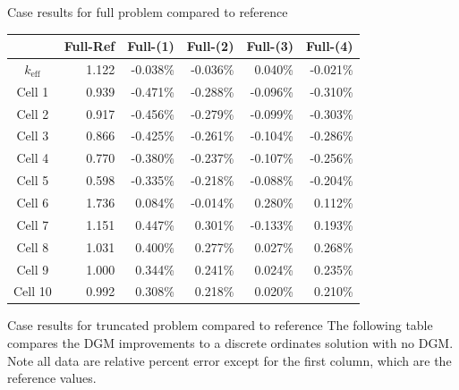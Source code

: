 \documentclass[final]{beamer}
\begin{document}
\begin{frame}{}
\begin{columns}[t]
\begin{column}{.32\linewidth}
\begin{block}{Case results for full problem compared to reference}
                \begin{tabular}{c|r|r|r|r|r}
                & Full-Ref & Full-(1)  & Full-(2) & Full-(3) & Full-(4)\\
                \hline
                $k_{\text{eff}}$& 1.122 & -0.038\% & -0.036\% &  0.040\% & -0.021\%\\
                \hline
                Cell 1&  0.939 & -0.471\% & -0.288\% & -0.096\% & -0.310\%\\
                Cell 2&  0.917 & -0.456\% & -0.279\% & -0.099\% & -0.303\%\\
                Cell 3&  0.866 & -0.425\% & -0.261\% & -0.104\% & -0.286\%\\
                Cell 4&  0.770 & -0.380\% & -0.237\% & -0.107\% & -0.256\%\\
                Cell 5&  0.598 & -0.335\% & -0.218\% & -0.088\% & -0.204\%\\
                Cell 6&  1.736 &  0.084\% & -0.014\% &  0.280\% &  0.112\%\\
                Cell 7&  1.151 &  0.447\% &  0.301\% & -0.133\% &  0.193\%\\
                Cell 8&  1.031 &  0.400\% &  0.277\% &  0.027\% &  0.268\%\\
                Cell 9&  1.000 &  0.344\% &  0.241\% &  0.024\% &  0.235\%\\
                Cell 10& 0.992 &  0.308\% &  0.218\% &  0.020\% &  0.210\%\\
                \hline
                \end{tabular}
                
            \end{block}
            \vspace{0.1eX}
            \begin{block}{Case results for truncated problem compared to reference}
                \centering
                The following table compares the DGM improvements to a discrete ordinates solution with no DGM.
                Note all data are relative percent error except for the first column, which are the reference values.
                \vspace{2eX}
                

\end{block}
\end{column}
\end{columns}
\end{frame}
\end{document}
